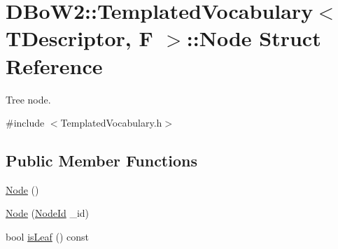 \hypertarget{structDBoW2_1_1TemplatedVocabulary_1_1Node}{}\section{D\+Bo\+W2\+:\+:Templated\+Vocabulary$<$ T\+Descriptor, F $>$\+:\+:Node Struct Reference}
\label{structDBoW2_1_1TemplatedVocabulary_1_1Node}


Tree node.  




{\ttfamily \#include $<$Templated\+Vocabulary.\+h$>$}

\subsection*{Public Member Functions}
\begin{DoxyCompactItemize}
\item 
\hyperlink{structDBoW2_1_1TemplatedVocabulary_1_1Node_a1339ee00108c4c652cd1ca55a37c3fd3}{Node} ()
\item 
\hyperlink{structDBoW2_1_1TemplatedVocabulary_1_1Node_a9f1fcb620025ba6103a47e5c2b169cd6}{Node} (\hyperlink{namespaceDBoW2_a3a0fa9c50c0df508759362d6204566f2}{Node\+Id} \+\_\+id)
\item 
bool \hyperlink{structDBoW2_1_1TemplatedVocabulary_1_1Node_a050a0ee173dd58475dd2ab84e6f215e8}{is\+Leaf} () const
\end{DoxyCompactItemize}
